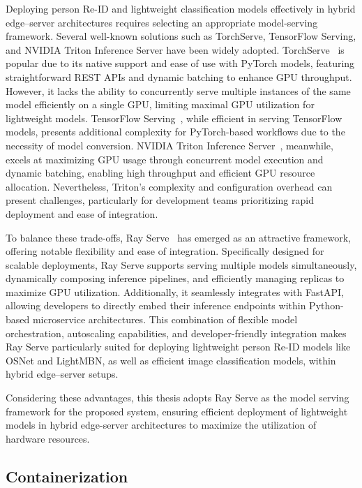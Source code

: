\documentclass[../main.tex]{subfiles}
\begin{document}
Deploying person Re-ID and lightweight classification models effectively in hybrid edge–server architectures requires selecting an appropriate model-serving framework. Several well-known solutions such as TorchServe, TensorFlow Serving, and NVIDIA Triton Inference Server have been widely adopted. TorchServe~\cite{torchserve} is popular due to its native support and ease of use with PyTorch models, featuring straightforward REST APIs and dynamic batching to enhance GPU throughput. However, it lacks the ability to concurrently serve multiple instances of the same model efficiently on a single GPU, limiting maximal GPU utilization for lightweight models. TensorFlow Serving~\cite{tfserving}, while efficient in serving TensorFlow models, presents additional complexity for PyTorch-based workflows due to the necessity of model conversion. NVIDIA Triton Inference Server~\cite{triton}, meanwhile, excels at maximizing GPU usage through concurrent model execution and dynamic batching, enabling high throughput and efficient GPU resource allocation. Nevertheless, Triton's complexity and configuration overhead can present challenges, particularly for development teams prioritizing rapid deployment and ease of integration.

To balance these trade-offs, Ray Serve~\cite{ray_serve_docs} has emerged as an attractive framework, offering notable flexibility and ease of integration. Specifically designed for scalable deployments, Ray Serve supports serving multiple models simultaneously, dynamically composing inference pipelines, and efficiently managing replicas to maximize GPU utilization. Additionally, it seamlessly integrates with FastAPI, allowing developers to directly embed their inference endpoints within Python-based microservice architectures. This combination of flexible model orchestration, autoscaling capabilities, and developer-friendly integration makes Ray Serve particularly suited for deploying lightweight person Re-ID models like OSNet and LightMBN, as well as efficient image classification models, within hybrid edge–server setups.

Considering these advantages, this thesis adopts Ray Serve as the model serving framework for the proposed system, ensuring efficient deployment of lightweight models in hybrid edge-server architectures to maximize the utilization of hardware resources.

\subsection{Containerization}
\label{sec:containerization}
\end{document}
